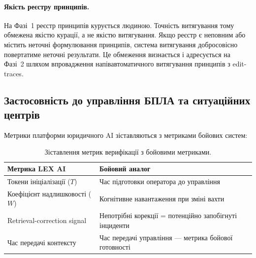 \paragraph{Якість реєстру принципів.}
На Фазі~1 реєстр принципів курується людиною.
Точність витягування тому обмежена якістю курації, а не якістю витягування.
Якщо реєстр є неповним або містить неточні формулювання принципів, система витягування добросовісно повертатиме неточні результати.
Це обмеження визнається і адресується на Фазі~2 шляхом впровадження напівавтоматичного витягування принципів з edit-traces.


\subsection{Застосовність до управління БПЛА та ситуаційних центрів}
\label{sec:metrics-mapping}

Метрики платформи юридичного AI зіставляються з метриками бойових систем:

\begin{table}[ht]
\centering
\caption{Зіставлення метрик верифікації з бойовими метриками.}
\label{tab:metrics-mapping}
\begin{tabular}{@{}p{5.5cm}p{5.5cm}@{}}
\toprule
\textbf{Метрика LEX AI} & \textbf{Бойовий аналог} \\
\midrule
Токени ініціалізації ($T$) & Час підготовки оператора до управління \\
Коефіцієнт надлишковості ($W$) & Когнітивне навантаження при зміні вахти \\
Retrieval-correction signal & Непотрібні корекції = потенційно запобігнуті інциденти \\
Час передачі контексту & Час передачі управління --- метрика бойової готовності \\
\bottomrule
\end{tabular}
\end{table}
